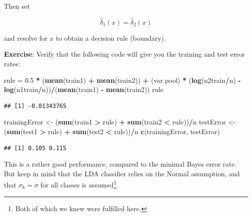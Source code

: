 \documentclass[
  10pt,
  ignorenonframetext,
]{beamer}
\newenvironment{Shaded}{\begin{snugshade}}{\end{snugshade}}
\newcommand{\FloatTok}[1]{\textcolor[rgb]{0.00,0.00,0.81}{#1}}
\newcommand{\FunctionTok}[1]{\textcolor[rgb]{0.13,0.29,0.53}{\textbf{#1}}}
\newcommand{\NormalTok}[1]{#1}
\newcommand{\OtherTok}[1]{\textcolor[rgb]{0.56,0.35,0.01}{#1}}
\newcommand{\SpecialCharTok}[1]{\textcolor[rgb]{0.81,0.36,0.00}{\textbf{#1}}}
\begin{document}
\begin{frame}[fragile]
Then set

\[\hat\delta_1(x) = \hat\delta_2(x)\]

and resolve for \(x\) to obtain a decision rule (boundary).

\vspace{2mm}

\textbf{Exercise}: Verify that the following code will give you the
training and test error rates:

\vspace{1mm}

\scriptsize

\begin{Shaded}
\begin{Highlighting}[]
\NormalTok{rule }\OtherTok{=} \FloatTok{0.5} \SpecialCharTok{*}\NormalTok{ (}\FunctionTok{mean}\NormalTok{(train1) }\SpecialCharTok{+} \FunctionTok{mean}\NormalTok{(train2)) }\SpecialCharTok{+}\NormalTok{ (var.pool) }\SpecialCharTok{*}\NormalTok{ (}\FunctionTok{log}\NormalTok{(n2train}\SpecialCharTok{/}\NormalTok{n) }\SpecialCharTok{{-}}
    \FunctionTok{log}\NormalTok{(n1train}\SpecialCharTok{/}\NormalTok{n))}\SpecialCharTok{/}\NormalTok{(}\FunctionTok{mean}\NormalTok{(train1) }\SpecialCharTok{{-}} \FunctionTok{mean}\NormalTok{(train2))}
\NormalTok{rule}
\end{Highlighting}
\end{Shaded}

\begin{verbatim}
## [1] -0.01343765
\end{verbatim}

\begin{Shaded}
\begin{Highlighting}[]
\NormalTok{trainingError }\OtherTok{\textless{}{-}}\NormalTok{ (}\FunctionTok{sum}\NormalTok{(train1 }\SpecialCharTok{\textgreater{}}\NormalTok{ rule) }\SpecialCharTok{+} \FunctionTok{sum}\NormalTok{(train2 }\SpecialCharTok{\textless{}}\NormalTok{ rule))}\SpecialCharTok{/}\NormalTok{n}
\NormalTok{testError }\OtherTok{\textless{}{-}}\NormalTok{ (}\FunctionTok{sum}\NormalTok{(test1 }\SpecialCharTok{\textgreater{}}\NormalTok{ rule) }\SpecialCharTok{+} \FunctionTok{sum}\NormalTok{(test2 }\SpecialCharTok{\textless{}}\NormalTok{ rule))}\SpecialCharTok{/}\NormalTok{n}
\FunctionTok{c}\NormalTok{(trainingError, testError)}
\end{Highlighting}
\end{Shaded}

\begin{verbatim}
## [1] 0.105 0.115
\end{verbatim}

\normalsize

This is a rather good performance, compared to the minimal Bayes error
rate. But keep in mind that the LDA classifier relies on the Normal
assumption, and that \(\sigma_k=\sigma\) for all classes is
assumed\footnote{Both of which we knew were fulfilled here.}.
\end{frame}
\end{document}
